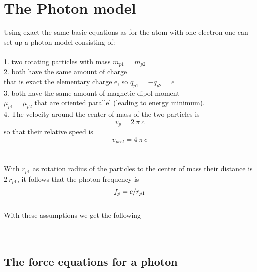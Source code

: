 \documentclass[10pt,titlepage]{article}
\begin{document}
\section{The Photon model}
Using exact the same basic equations as for the atom with one electron one can set up a photon model consisting of:
\\\\
1. two rotating particles with mass $m_{p1}$ = $m_{p2}$\\
2. both have the same amount of charge\\
 that is exact the elementary charge e, 
so $q_{p1}   =  -q_{p2}  = e$
\\
3. both have the same amount of magnetic dipol moment\\
$ \mu_{ p1}= \mu_{p2}$ that are oriented parallel (leading to energy minimum).\\
4. The velocity around the center of mass of the two particles is
\begin{equation}
v_p=2 \ \pi \ c
\end{equation}
so that their relative speed is
\begin{equation}
v_{prel}=4 \ \pi \ c
\end{equation}
\\\\With $r_{p1}$ as rotation radius of the particles to the center of mass their distance is $2 \ r_{p1}$,
it follows that the photon frequency is
\begin{equation}\\\\
f_{p}=c/r_{p1}
\end{equation}
\\
With these assumptions we get the following\\
\\\\
\subsection{The force equations for a photon}
 
\end{document}
